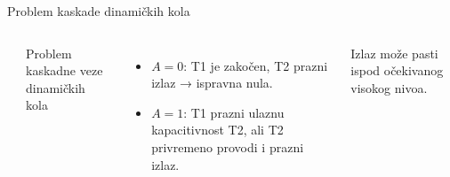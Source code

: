\begin{frame}[label=09_3-s070]{Problem kaskade dinamičkih kola}
\begin{columns}[c,onlytextwidth]
\begin{center}

\end{center}
\alert{Problem kaskadne veze dinamičkih kola}
\begin{itemize}
\item $A=0$: T1 je zakočen, T2 prazni izlaz → ispravna nula.
\item $A=1$: T1 prazni ulaznu kapacitivnost T2, ali T2 privremeno provodi i prazni izlaz.
\end{itemize}
Izlaz može pasti ispod očekivanog visokog nivoa.
\end{columns}
\end{frame}
